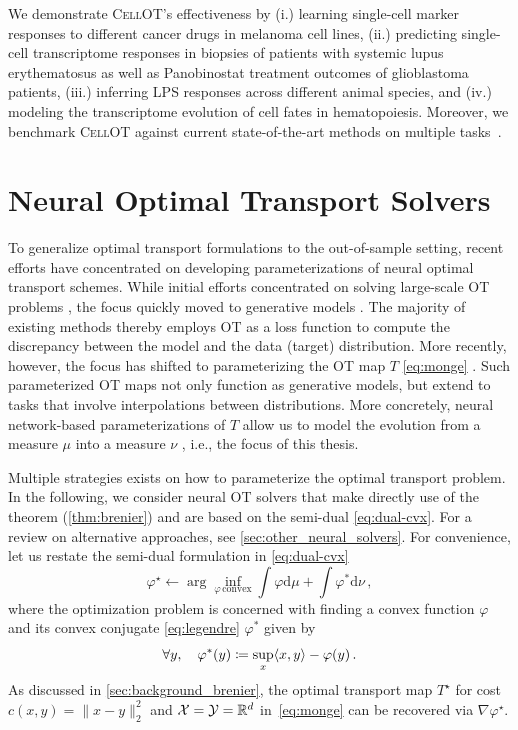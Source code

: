  We demonstrate \textsc{CellOT}'s effectiveness by (i.) learning single-cell marker responses to different cancer drugs in melanoma cell lines, (ii.) predicting single-cell transcriptome responses in biopsies of patients with systemic lupus erythematosus as well as Panobinostat treatment outcomes of glioblastoma patients, (iii.) inferring LPS responses across different animal species, and (iv.) modeling the transcriptome evolution of cell fates in hematopoiesis. Moreover, we benchmark \textsc{CellOT} against current state-of-the-art methods on multiple tasks~\citep{lopez2018scvi, lotfollahi2019scgen, chen2020dissecting}.

\section{Neural Optimal Transport Solvers} \label{sec:neural_solvers}

To generalize optimal transport formulations to the out-of-sample setting, recent efforts have concentrated on developing parameterizations of neural optimal transport schemes.
While initial efforts concentrated on solving large-scale \acrshort{OT} problems \citep{seguy2018large}, the focus quickly moved to generative models \citep{arjovsky2017wasserstein, genevay2018learning}.
The majority of existing methods thereby employs \acrshort{OT} as a loss function to compute the discrepancy between the model and the data (target) distribution. 
More recently, however, the focus has shifted to parameterizing the \acrshort{OT} map $T$ \eqref{eq:monge} \citep{yang2018scalable, rout2021generative, daniels2021score}. Such parameterized OT maps not only function as generative models, but extend to tasks that involve interpolations between distributions. More concretely, neural network-based parameterizations of $T$ allow us to model the evolution from a measure $\mu$ into a measure $\nu$ \citep{tong2020trajectorynet}, i.e., the focus of this thesis.

Multiple strategies exists on how to parameterize the optimal transport problem.
In the following, we consider neural \acrshort{OT} solvers that make directly use of the \citeauthor{brenier1987decomposition} theorem (\cref{thm:brenier}) and are based on the semi-dual \eqref{eq:dual-cvx}. For a review on alternative approaches, see \cref{sec:other_neural_solvers}.
For convenience, let us restate the semi-dual formulation in \eqref{eq:dual-cvx}
\begin{equation*}
	\varphi^\star \leftarrow \arg\inf_{\varphi\, \text{convex}} \int \varphi \textrm{d}\mu + \int \varphi^*\textrm{d}\nu\,,
\end{equation*}
where the optimization problem is concerned with finding a convex function $\varphi$ and its convex conjugate \eqref{eq:legendre} $\varphi^*$ given by
\begin{equation} \label{eq:varphi_conjugate}
	\forall y, \quad \varphi^*(y) \coloneqq \sup _x \langle x, y\rangle-\varphi(y)\,.	
\end{equation}
As discussed in \cref{sec:background_brenier}, the optimal transport map $T^\star$ for cost $c(x,y) = \|x-y\|^2_2$ and ${\mathcal{X}} = {\mathcal{Y}} = \mathbb{R}^d$ in~\eqref{eq:monge} can be recovered via $\nabla \varphi^\star$.

